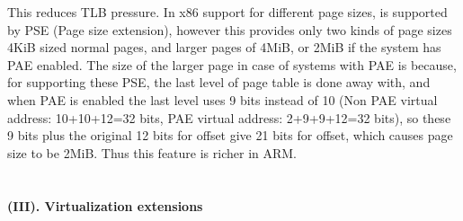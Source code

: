 \documentclass[seminar,twoside]{iitbreport}
\begin{document}
This reduces TLB pressure. 
In x86 support for different page sizes, is supported by PSE (Page size extension), however this provides only two kinds of page sizes 4KiB sized normal pages, and larger pages of 4MiB, or 2MiB if the system has PAE enabled. The size of the larger page in case of systems with PAE is because, for supporting these PSE, the last level of page table is done away with, and when PAE is enabled the last level uses 9 bits instead of 10 (Non PAE virtual address: 10+10+12=32 bits, PAE virtual address: 2+9+9+12=32 bits), so these 9 bits plus the original 12 bits for offset give 21 bits for offset, which causes page size to be 2MiB. Thus this feature is richer in ARM.
\\\\\\
\textbf{(III). Virtualization extensions}
\\\\
\end{document}
